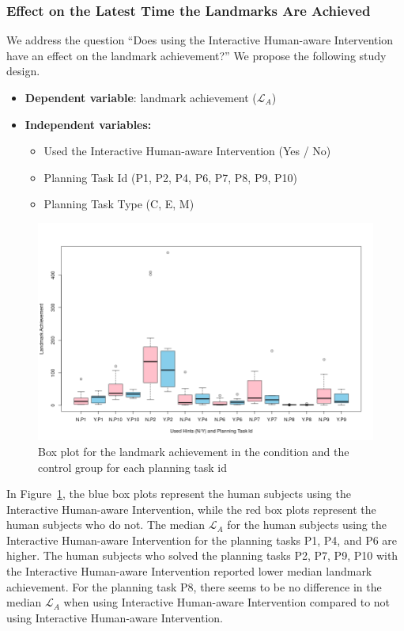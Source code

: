 \subsubsection{Effect on the Latest Time the Landmarks Are Achieved}
We address the question ``Does using the Interactive Human-aware Intervention have an effect on the landmark achievement?''
We propose the following study design.
\begin{itemize}
\item \textbf{Dependent variable}: landmark achievement ($\mathcal{L}_A$)
\item \textbf{Independent variables:}
\begin{itemize}
\item Used the Interactive Human-aware Intervention (Yes / No)
\item Planning Task Id (P1, P2, P4, P6, P7, P8, P9, P10)
\item Planning Task Type (C, E, M)
\end{itemize}
\end{itemize}

\begin{figure}[tpb]
  \centering
\includegraphics[width=\columnwidth]{img/achbypid.png}
  \caption{Box plot for the landmark achievement in the condition and the control group for each planning task id}
  \label{fig:achbypid}
\end{figure}
In Figure~\ref{fig:achbypid}, the blue box plots represent the human subjects using the Interactive Human-aware Intervention, while the red box plots represent the human subjects who do not.
The median $\mathcal{L}_A$ for the human subjects using the Interactive Human-aware Intervention for the planning tasks P1, P4, and P6 are higher.
The human subjects who solved the planning tasks P2, P7, P9, P10 with the Interactive Human-aware Intervention reported lower median landmark achievement.
For the planning task P8, there seems to be no difference in the median $\mathcal{L}_A$ when using Interactive Human-aware Intervention compared to not using Interactive Human-aware Intervention.


